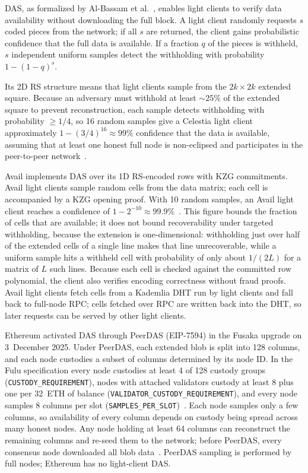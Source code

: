 DAS, as formalized by Al-Bassam et al.~\cite{AlBassam_FraudDA}, enables light clients to verify data availability without downloading the full block.
A light client randomly requests $s$ coded pieces from the network; if all $s$ are returned, the client gains probabilistic confidence that the full data is available.
If a fraction $q$ of the pieces is withheld, $s$ independent uniform samples detect the withholding with probability $1-(1-q)^s$.

Its 2D RS structure means that light clients sample from the $2k \times 2k$ extended square.
Because an adversary must withhold at least ${\sim}25\%$ of the extended square to prevent reconstruction, each sample detects withholding with probability ${\ge}1/4$, so 16 random samples give a Celestia light client approximately $1 - (3/4)^{16} \approx 99\%$ confidence that the data is available, assuming that at least one honest full node is non-eclipsed and participates in the peer-to-peer network~\cite{AlBassam_LazyLedger}.

Avail implements DAS over its 1D RS-encoded rows with KZG commitments.
Avail light clients sample random cells from the data matrix; each cell is accompanied by a KZG opening proof.
With 10 random samples, an Avail light client reaches a confidence of $1 - 2^{-10} \approx 99.9\%$~\cite{Avail_The_DA_Blockchain}. This figure bounds the fraction of cells that are available; it does not bound recoverability under targeted withholding, because the extension is one-dimensional: withholding just over half of the extended cells of a single line makes that line unrecoverable, while a uniform sample hits a withheld cell with probability of only about $1/(2L)$ for a matrix of $L$ such lines.
Because each cell is checked against the committed row polynomial, the client also verifies encoding correctness without fraud proofs.
Avail light clients fetch cells from a Kademlia DHT run by light clients and fall back to full-node RPC; cells fetched over RPC are written back into the DHT, so later requests can be served by other light clients.

Ethereum activated DAS through PeerDAS (EIP-7594) in the Fusaka upgrade on 3~December 2025.
Under PeerDAS, each extended blob is split into 128 columns, and each node custodies a subset of columns determined by its node ID.
In the Fulu specification every node custodies at least 4 of 128 custody groups (\texttt{CUSTODY\_REQUIREMENT}), nodes with attached validators custody at least 8 plus one per 32~ETH of balance (\texttt{VALIDATOR\_CUSTODY\_REQUIREMENT}), and every node samples 8 columns per slot (\texttt{SAMPLES\_PER\_SLOT})~\cite{EIP-7594}.
Each node samples only a few columns, so availability of every column depends on custody being spread across many honest nodes.
Any node holding at least 64 columns can reconstruct the remaining columns and re-seed them to the network; before PeerDAS, every consensus node downloaded all blob data~\cite{EIP-7594}. PeerDAS sampling is performed by full nodes; Ethereum has no light-client DAS.

